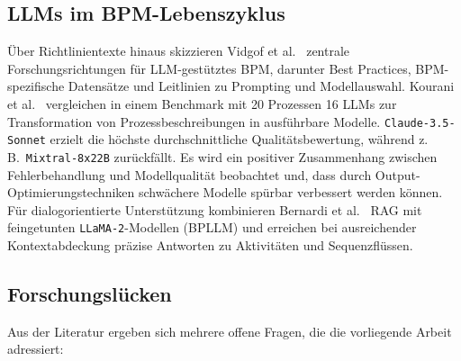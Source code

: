 \subsection*{\acp{LLM} im BPM-Lebenszyklus}

Über Richtlinientexte hinaus skizzieren Vidgof et al.\ \cite{vidgof2023largelanguagemodelsbusiness} zentrale Forschungsrichtungen für \ac{LLM}-gestütztes \ac{BPM}, darunter Best Practices, \ac{BPM}-spezifische Datensätze und Leitlinien zu Prompting und Modellauswahl. Kourani et al.\ \cite{kourani2025evaluating} vergleichen in einem Benchmark mit 20 Prozessen 16 \acp{LLM} zur Transformation von Prozessbeschreibungen in ausführbare Modelle. \texttt{Claude-3.5-Sonnet} erzielt die höchste durchschnittliche Qualitätsbewertung, während z.\,B.\ \texttt{Mixtral-8x22B} zurückfällt. Es wird ein positiver Zusammenhang zwischen Fehlerbehandlung und Modellqualität beobachtet und, dass durch Output-Optimierungstechniken schwächere Modelle spürbar verbessert werden können. Für dialogorientierte Unterstützung kombinieren Bernardi et al.\ \cite{bernardi2024conversing} \ac{RAG} mit feingetunten \texttt{LLaMA-2}-Modellen (BPLLM) und erreichen bei ausreichender Kontextabdeckung präzise Antworten zu Aktivitäten und Sequenzflüssen.

\subsection*{Forschungslücken}

Aus der Literatur ergeben sich mehrere offene Fragen, die die vorliegende Arbeit adressiert:

